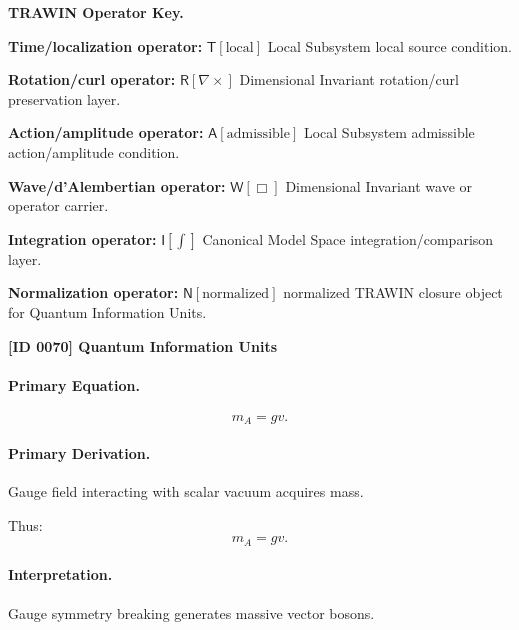 \par\vspace{0.45\baselineskip}
\noindent\begin{minipage}[t]{\linewidth}
\begingroup
\small
\raggedright
\textbf{TRAWIN Operator Key.}\par
\noindent\textbf{Time/localization operator:} $\mathsf{T}\!\left[\mathrm{local}\right]$ Local Subsystem local source condition.\par
\noindent\textbf{Rotation/curl operator:} $\mathsf{R}\!\left[\nabla\times\right]$ Dimensional Invariant rotation/curl preservation layer.\par
\noindent\textbf{Action/amplitude operator:} $\mathsf{A}\!\left[\mathrm{admissible}\right]$ Local Subsystem admissible action/amplitude condition.\par
\noindent\textbf{Wave/d'Alembertian operator:} $\mathsf{W}\!\left[\Box\right]$ Dimensional Invariant wave or operator carrier.\par
\noindent\textbf{Integration operator:} $\mathsf{I}\!\left[\int\right]$ Canonical Model Space integration/comparison layer.\par
\noindent\textbf{Normalization operator:} $\mathsf{N}\!\left[\mathrm{normalized}\right]$ normalized TRAWIN closure object for Quantum Information Units.\par
\endgroup
\end{minipage}

\clearpage
\noindent\textbf{[ID 0070] Quantum Information Units}\par
\vspace{0.35em}
\paragraph{Primary Equation.}
\begin{equation}
m_A = gv.
\end{equation}

\paragraph{Primary Derivation.}
Gauge field interacting with scalar vacuum acquires mass.

Thus:
\begin{equation}
\boxed{
m_A = gv.
}
\end{equation}

\paragraph{Interpretation.}
Gauge symmetry breaking generates massive vector bosons.

